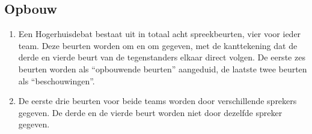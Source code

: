 \subsection{Opbouw}

\begin{enumerate}
\item Een Hogerhuisdebat bestaat uit in totaal acht spreekbeurten, vier voor ieder team. Deze beurten worden om en om gegeven, met de kanttekening dat de derde en vierde beurt van de tegenstanders elkaar direct volgen. De eerste zes beurten worden als “opbouwende beurten” aangeduid, de laatste twee beurten als “beschouwingen”.
\item De eerste drie beurten voor beide teams worden door verschillende sprekers gegeven. De derde en de vierde beurt worden niet door dezelfde spreker gegeven.
\end{enumerate}
